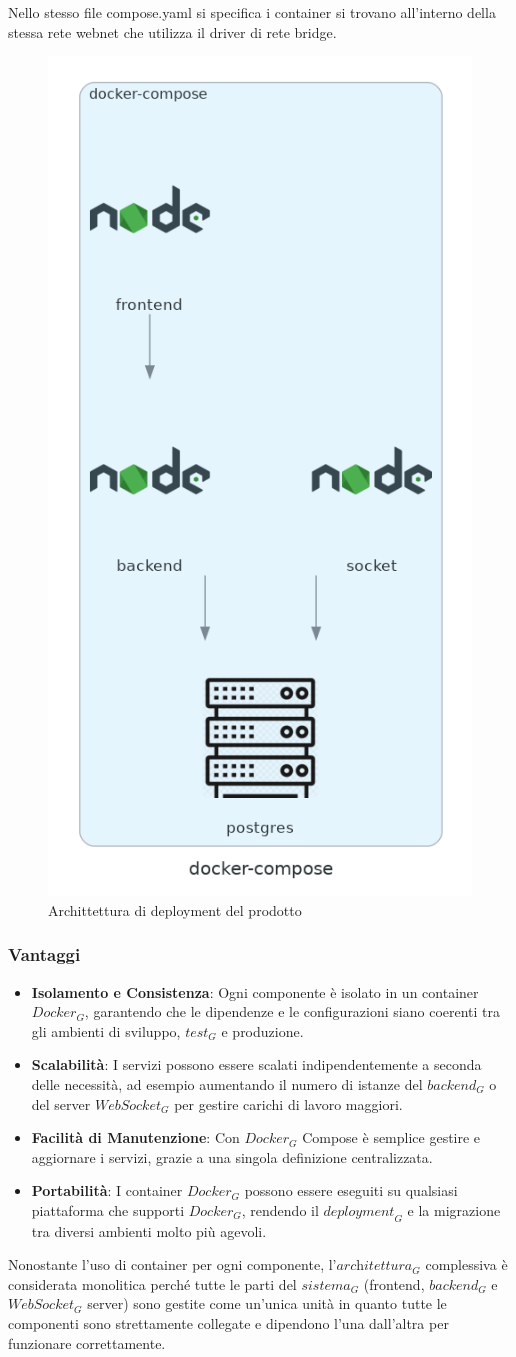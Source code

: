 Nello stesso file compose.yaml si specifica i container si trovano all’interno della stessa rete webnet che utilizza il driver di rete bridge.
\begin{figure}[H]
  \centering
  \includegraphics[width=0.4\linewidth]{images/docker-compose.png}
\caption{Archittettura di deployment del prodotto}
\end{figure}
\subsubsection{Vantaggi}
\begin{itemize}
\item \textbf{Isolamento e Consistenza}: Ogni componente è isolato in un container $\textit{Docker}_G$, garantendo che le dipendenze e le configurazioni siano coerenti tra gli ambienti di sviluppo, $\textit{test}_G$ e produzione.
\item \textbf{Scalabilità}: I servizi possono essere scalati indipendentemente a seconda delle necessità, ad esempio aumentando il numero di istanze del $\textit{backend}_G$ o del server $\textit{WebSocket}_G$ per gestire carichi di lavoro maggiori.
\item \textbf{Facilità di Manutenzione}: Con $\textit{Docker}_G$ Compose è semplice gestire e aggiornare i servizi, grazie a una singola definizione centralizzata.
\item \textbf{Portabilità}: I container $\textit{Docker}_G$ possono essere eseguiti su qualsiasi piattaforma che supporti $\textit{Docker}_G$, rendendo il $\textit{deployment}_G$ e la migrazione tra diversi ambienti molto più agevoli.
\end{itemize}
Nonostante l'uso di container per ogni componente, l'$\textit{architettura}_G$ complessiva è considerata monolitica perché tutte le parti del $\textit{sistema}_G$ (frontend, $\textit{backend}_G$ e $\textit{WebSocket}_G$ server) sono gestite come un'unica unità in quanto tutte le componenti sono strettamente collegate e dipendono l'una dall'altra per funzionare correttamente.